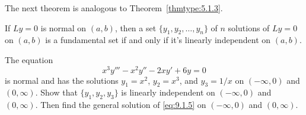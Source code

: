 \documentclass{ximera}
\begin{document}
The next theorem is analogous to
Theorem~\ref{thmtype:5.1.3}.

\begin{theorem}\label{thmtype:9.1.2}
If  $Ly=0$ is normal on $(a,b)$, then a set
$\{y_1,y_2,\dots,y_n\}$ of $n$ solutions of $Ly=0$ on $(a,b)$ is a
fundamental set if and only if it's linearly independent on $(a,b)$.
\end{theorem}

\begin{example}\label{example:9.1.1}
The equation
\begin{equation}\label{eq:9.1.5}
x^3y'''-x^2y''-2xy'+6y=0
\end{equation}
is normal and has the solutions $y_1=x^2$, $y_2=x^3$, and $y_3=1/x$ on
$(-\infty,0)$ and $(0,\infty)$.  Show that $\{y_1,y_2,y_3\}$
is linearly independent on $(-\infty, 0)$ and $(0,\infty)$. Then find
the general solution of \eqref{eq:9.1.5} on $(-\infty, 0)$ and
$(0,\infty)$.



\end{example}
\end{document}
